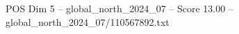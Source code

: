 \begin{textsample}{POS Dim 5 – global\_north\_2024\_07 – Score 13.00 – global\_north\_2024\_07/110567892.txt}
\end{textsample}
